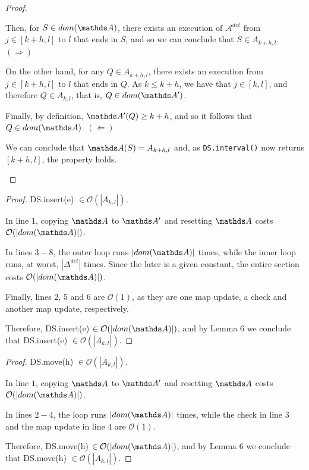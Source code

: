 \begin{proof}
\begin{itemize}
Then, for $S\in dom(\dsA)$, there exists an execution of $\mathcal{A}^{det}$ from $j\in[k+h,l]$ to $l$ that ends in $S$, and so we can conclude that $S\in A_{k+h,l}$.  $(\Rightarrow)$

On the other hand, for any $Q\in A_{k+h,l}$, there exists an execution from $j\in[k+h,l]$ to $l$ that ends in $Q$. As $k\leq k+h$, we have that $j\in[k,l]$, and therefore $Q\in A_{k,l}$, that is, $Q\in dom(\dsA')$. 

Finally, by definition, $\dsA'(Q)\geq k+h$, and so it follows that $Q\in dom(\dsA)$. $(\Leftarrow)$

We can conclude that $\dsA(S) = A_{k+h,l}$ and, as \texttt{DS.interval()} now returns $[k+h,l]$, the property holds.

\end{itemize}

\end{proof}

\begin{proof}
DS.insert(e) $\in \mathcal{O}(|A_{k,l}|) $.

In line $1$, copying $\dsA$ to $\dsA'$ and resetting $\dsA$ costs $\mathcal{O}(|dom(\dsA)|)$.

In lines $3-8$, the outer loop runs $|dom(\dsA)|$ times, while the inner loop runs, at worst, $|\Delta^{det}|$ times. Since the later is a given constant, the entire section costs $\mathcal{O}(|dom(\dsA)|)$.

Finally, lines 2, 5 and 6 are $\mathcal{O}(1)$, as they are one map update, a check and another map update, respectively.

Therefore, DS.insert(e) $\in \mathcal{O}(|dom(\dsA)|) $, and by Lemma 6 we conclude that DS.insert(e) $\in \mathcal{O}(|A_{k,l}|) $.
\end{proof}

\begin{proof}
DS.move(h) $\in \mathcal{O}(|A_{k,l}|) $.

In line $1$, copying $\dsA$ to $\dsA'$ and resetting $\dsA$ costs $\mathcal{O}(|dom(\dsA)|)$.

In lines $2-4$, the loop runs $|dom(\dsA)|$ times, while the check in line $3$ and the map update in line $4$ are $\mathcal{O}(1)$.

Therefore, DS.move(h) $\in \mathcal{O}(|dom(\dsA)|) $, and by Lemma 6 we conclude that DS.move(h) $\in \mathcal{O}(|A_{k,l}|) $.
\end{proof}





